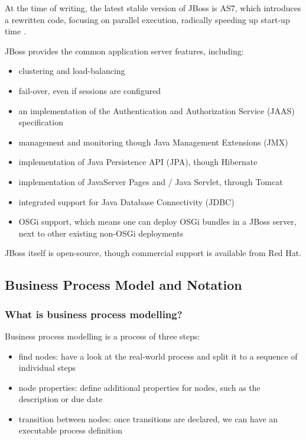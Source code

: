 At the time of writing, the latest stable version of JBoss is AS7, which
introduces a rewritten code, focusing on parallel execution, radically speeding
up start-up time \cite{jboss-fast}.

JBoss provides the common application server features, including:

\begin{itemize}
\item clustering and load-balancing
\item fail-over, even if sessions are configured
\item an implementation of the Authentication and Authorization Service (JAAS)
specification
\item management and monitoring though Java Management Extensions (JMX)
\item implementation of Java Persistence API (JPA), though Hibernate
\item implementation of JavaServer Pages and / Java Servlet, through Tomcat
\item integrated support for Java Database Connectivity (JDBC)
\item OSGi support, which means one can deploy OSGi bundles in a JBoss server,
next to other existing non-OSGi deployments
\end{itemize}

JBoss itself is open-source, though commercial support is available from Red Hat.

\subsection{Business Process Model and Notation}
\label{sec:bpmn}

\subsubsection*{What is business process modelling?}

Business process modelling is a process of three steps:

\begin{itemize}
\item find nodes: have a look at the real-world process and split it to a sequence of individual steps
\item node properties: define additional properties for nodes, such as the description or due date
\item transition between nodes: once transitions are declared, we can have an executable process definition
\end{itemize}

